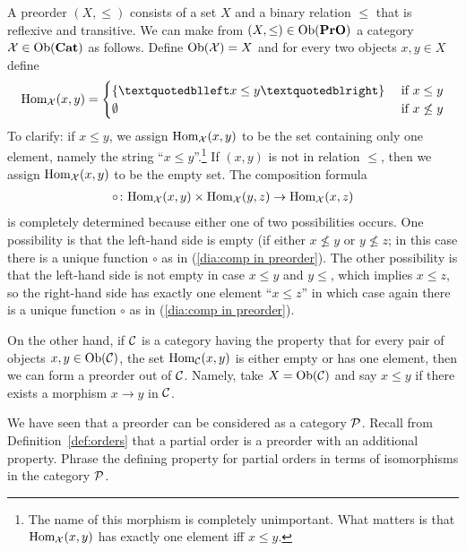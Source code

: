\documentclass[CT4S-EN-RU]{subfiles}
\begin{document}
\begin{blockENG}
A preorder $(X,\leq)$ consists of a set $X$ and a binary relation $\leq$ that is reflexive and transitive. We can make from $(X,\leq)\in\textnormal{Ob}({\mathbf{PrO}})$ a category $\mathcal{X}\in\textnormal{Ob}({\mathbf{Cat}})$ as follows. Define $\textnormal{Ob}(\mathcal{X})=X$ and for every two objects $x,y\in X$ define
$$\Hom_\mcX(x,y)=\begin{cases}\{“x\leq y”\}&\tn{ if } x\leq y\\\emptyset&\tn{ if } x\not\leq y\end{cases}$$
To clarify: if $x\leq y$, we assign $\textnormal{Hom}_\mathcal{X}(x,y)$ to be the set containing only one element, namely the string “$x\leq y$”.\footnote{The name of this morphism is completely unimportant. What matters is that $\textnormal{Hom}_\mathcal{X}(x,y)$ has exactly one element iff $x\leq y$.} If $(x,y)$ is not in relation $\leq$, then we assign $\textnormal{Hom}_\mathcal{X}(x,y)$ to be the empty set. The composition formula 
\begin{align}\label{dia:comp in preorder}
\circ\colon\textnormal{Hom}_\mathcal{X}(x,y)\times\textnormal{Hom}_\mathcal{X}(y,z)\rightarrow\textnormal{Hom}_\mathcal{X}(x,z)
\end{align}
is completely determined because either one of two possibilities occurs. One possibility is that the left-hand side is empty (if either $x\not\leq y$ or $y\not\leq z$; in this case there is a unique function $\circ$ as in (\ref{dia:comp in preorder}). The other possibility is that the left-hand side is not empty in case $x\leq y$ and $y\leq$, which implies $x\leq z$, so the right-hand side has exactly one element $“x\leq z”$ in which case again there is a unique function $\circ$ as in (\ref{dia:comp in preorder}).
\end{blockENG}

\begin{blockRUS}
\end{blockRUS}

\begin{blockENG}
On the other hand, if $\mathcal{C}$ is a category having the property that for every pair of objects $x,y\in\textnormal{Ob}(\mathcal{C})$, the set $\textnormal{Hom}_\mathcal{C}(x,y)$ is either empty or has one element, then we can form a preorder out of $\mathcal{C}$. Namely, take $X=\textnormal{Ob}(\mathcal{C})$ and say $x\leq y$ if there exists a morphism $x\to y$ in $\mathcal{C}$. 
\end{blockENG}

\begin{blockRUS}
\end{blockRUS}

\begin{exerciseENG}
We have seen that a preorder can be considered as a category $\mathcal{P}$. Recall from Definition~\ref{def:orders} that a partial order is a preorder with an additional property. Phrase the defining property for partial orders in terms of isomorphisms in the category $\mathcal{P}$.
\end{exerciseENG}
\end{document}
